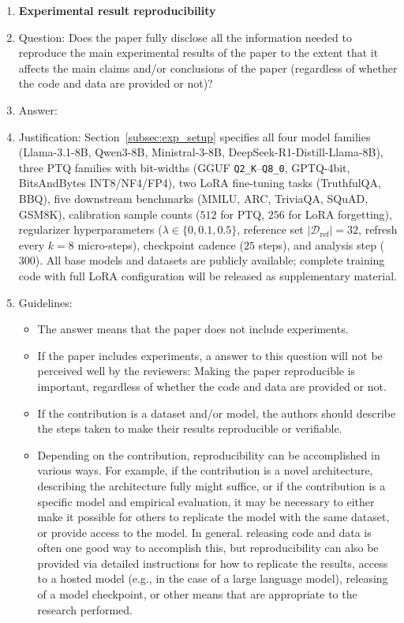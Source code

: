 \begin{enumerate}
    \item {\bf Experimental result reproducibility}
    \item[] Question: Does the paper fully disclose all the information needed to reproduce the main experimental results of the paper to the extent that it affects the main claims and/or conclusions of the paper (regardless of whether the code and data are provided or not)?
    \item[] Answer: \answerYes{}
    \item[] Justification: Section~\ref{subsec:exp_setup} specifies all four model families (Llama-3.1-8B, Qwen3-8B, Ministral-3-8B, DeepSeek-R1-Distill-Llama-8B), three PTQ families with bit-widths (GGUF \texttt{Q2\_K}--\texttt{Q8\_0}, GPTQ-4bit, BitsAndBytes INT8/NF4/FP4), two LoRA fine-tuning tasks (TruthfulQA, BBQ), five downstream benchmarks (MMLU, ARC, TriviaQA, SQuAD, GSM8K), calibration sample counts ($512$ for PTQ, $256$ for LoRA forgetting), regularizer hyperparameters ($\lambda \in \{0, 0.1, 0.5\}$, reference set $|\mathcal{D}_{\mathrm{ref}}|=32$, refresh every $k=8$ micro-steps), checkpoint cadence ($25$ steps), and analysis step ($300$). All base models and datasets are publicly available; complete training code with full LoRA configuration will be released as supplementary material.
    \item[] Guidelines:
    \begin{itemize}
        \item The answer \answerNA{} means that the paper does not include experiments.
        \item If the paper includes experiments, a \answerNo{} answer to this question will not be perceived well by the reviewers: Making the paper reproducible is important, regardless of whether the code and data are provided or not.
        \item If the contribution is a dataset and\slash or model, the authors should describe the steps taken to make their results reproducible or verifiable.
        \item Depending on the contribution, reproducibility can be accomplished in various ways. For example, if the contribution is a novel architecture, describing the architecture fully might suffice, or if the contribution is a specific model and empirical evaluation, it may be necessary to either make it possible for others to replicate the model with the same dataset, or provide access to the model. In general. releasing code and data is often one good way to accomplish this, but reproducibility can also be provided via detailed instructions for how to replicate the results, access to a hosted model (e.g., in the case of a large language model), releasing of a model checkpoint, or other means that are appropriate to the research performed.

\end{itemize}
\end{enumerate}
